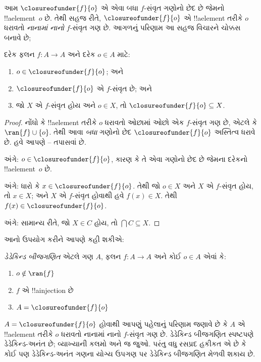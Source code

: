 \documentclass[../../../include/open-logic-section]{subfiles}
\begin{document}
આમ $\closureofunder{f}{o}$ એ એવા બધા $f$-સંવૃત ગણોનો છેદ છે
જેમનો !!a{element}~$o$ છે. તેથી સહજ રીતે,
$\closureofunder{f}{o}$ એ !!a{element} તરીકે $o$ ધરાવતો
\emph{નાનામાં નાનો} $f$-સંવૃત ગણ છે. આગળનું પરિણામ આ સહજ વિચારને
ચોક્કસ બનાવે છે;
\begin{lem}
	દરેક ફલન $f \colon A \to A$ અને દરેક $o \in A$ માટે:
	\begin{enumerate}
		\item{} $o \in \closureofunder{f}{o}$; અને
		\item{} $\closureofunder{f}{o}$ એ $f$-સંવૃત છે; અને
		\item{} જો $X$ એ $f$-સંવૃત હોય અને $o \in
		X$, તો $\closureofunder{f}{o} \subseteq X$.
	\end{enumerate}
\end{lem}

\begin{proof}
નોંધો કે !!a{element} તરીકે $o$ ધરાવતો ઓછામાં ઓછો એક $f$-સંવૃત ગણ
છે, એટલે કે $\ran{f}\cup \{o\}$. તેથી આવા \emph{બધા} ગણોનો છેદ
$\closureofunder{f}{o}$ અસ્તિત્વ ધરાવે છે. હવે આપણે
-- તપાસવાં છે.

 અંગે: $o \in \closureofunder{f}{o}$, કારણ કે
તે એવા ગણોનો છેદ છે જેમના દરેકનો !!a{element}~$o$ છે.

 અંગે: ધારો કે $x \in \closureofunder{f}{o}$.
તેથી જો $o \in X$ અને $X$ એ $f$-સંવૃત હોય, તો $x \in X$; અને
$X$ એ $f$-સંવૃત હોવાથી હવે $f(x) \in X$. તેથી
$f(x) \in \closureofunder{f}{o}$.

 અંગે: સામાન્ય રીતે, જો $X \in C$ હોય, તો
$\bigcap C \subseteq X$.
\end{proof}

આનો ઉપયોગ કરીને આપણે કહી શકીએ:

\begin{defn}
\emph{ડેડેકિન્ડ બીજગણિત} એટલે ગણ $A$, ફલન $f \colon A \to A$
અને કોઈ $o \in A$ એવાં કે:
	\begin{enumerate}
		\item {} $o \notin \ran{f}$
		\item {} $f$ એ !!a{injection} છે
		\item {} $A = \closureofunder{f}{o}$
	\end{enumerate}
\end{defn}

$A = \closureofunder{f}{o}$ હોવાથી આપણું પહેલાનું પરિણામ જણાવે છે કે
$A$ એ !!a{element} તરીકે $o$ ધરાવતો નાનામાં નાનો $f$-સંવૃત ગણ છે.
ડેડેકિન્ડ બીજગણિત સ્પષ્ટપણે ડેડેકિન્ડ-અનંત છે; વ્યાખ્યાની કલમો
 અને  જ જુઓ. પરંતુ વધુ રસપ્રદ
હકીકત એ છે કે કોઈ પણ ડેડેકિન્ડ-અનંત ગણના યોગ્ય ઉપગણ પર ડેડેકિન્ડ બીજગણિત મેળવી
શકાય છે.
\end{document}
